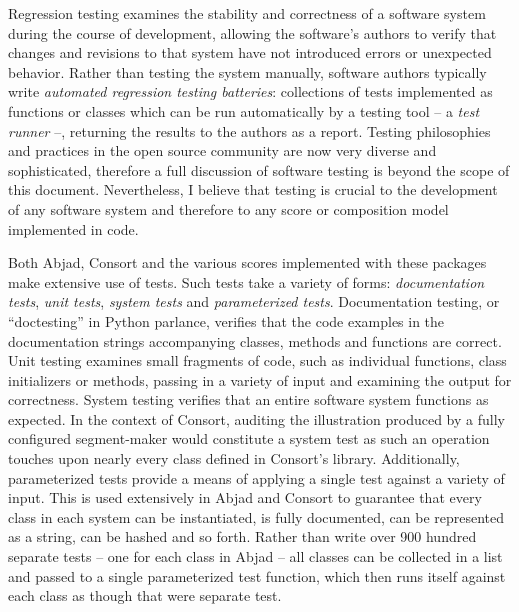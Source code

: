
Regression testing\cite{beazley2013python} examines the stability and
correctness of a software system during the course of development, allowing the
software's authors to verify that changes and revisions to that system have not
introduced errors or unexpected behavior. Rather than testing the system
manually, software authors typically write \emph{automated regression testing
batteries}: collections of tests implemented as functions or classes which can
be run automatically by a testing tool -- a \emph{test runner} --, returning
the results to the authors as a report. Testing philosophies and practices in
the open source community are now very diverse and sophisticated, therefore a
full discussion of software testing is beyond the scope of this document.
Nevertheless, I believe that testing is crucial to the development of any
software system and therefore to any score or composition model implemented in
code.

Both Abjad, Consort and the various scores implemented with these packages make
extensive use of tests. Such tests take a variety of forms:
\emph{documentation tests}, \emph{unit tests}, \emph{system tests} and
\emph{parameterized tests}. Documentation testing, or \enquote{doctesting} in
Python parlance, verifies that the code examples in the documentation strings
accompanying classes, methods and functions are correct. Unit testing examines
small fragments of code, such as individual functions, class initializers or
methods, passing in a variety of input and examining the output for
correctness. System testing verifies that an entire software system functions
as expected. In the context of Consort, auditing the illustration produced by a
fully configured segment-maker would constitute a system test as such an
operation touches upon nearly every class defined in Consort's library.
Additionally, parameterized tests provide a means of applying a single test
against a variety of input. This is used extensively in Abjad and Consort to
guarantee that every class in each system can be instantiated, is fully
documented, can be represented as a string, can be hashed and so forth. Rather
than write over 900 hundred separate tests -- one for each class in Abjad --
all classes can be collected in a list and passed to a single parameterized
test function, which then runs itself against each class as though that were
separate test.

